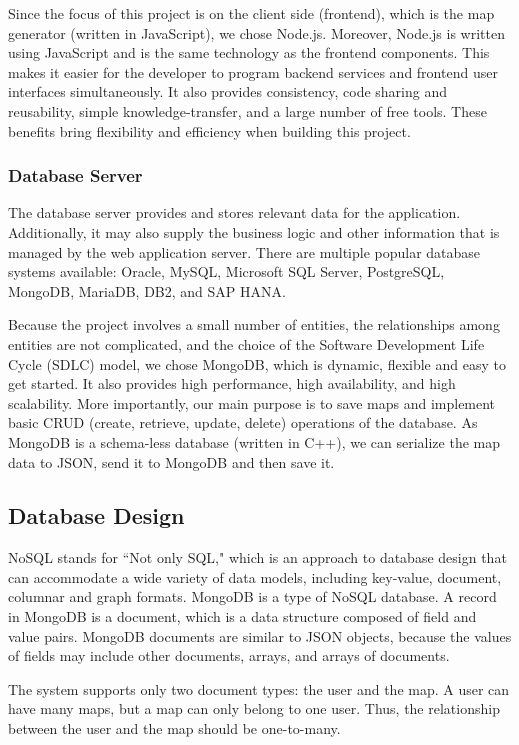 Since the focus of this project is on the client side (frontend), which is the map generator (written in JavaScript), we chose Node.js. Moreover, Node.js is written using JavaScript and is the same technology as the frontend components. This makes it easier for the developer to program backend services and frontend user interfaces simultaneously. It also provides consistency, code sharing and reusability, simple knowledge-transfer, and a large number of free tools. These benefits bring flexibility and efficiency when building this project.

\subsubsection{Database Server}
\label{sec:Design>Architecture Design>Database Server}
The database server provides and stores relevant data for the application. Additionally, it may also supply the business logic and other information that is managed by the web application server. There are multiple popular database systems available: Oracle, MySQL, Microsoft SQL Server, PostgreSQL, MongoDB, MariaDB, DB2, and SAP HANA.

Because the project involves a small number of entities, the relationships among entities are not complicated, and the choice of the Software Development Life Cycle (SDLC) model, we chose MongoDB, which is dynamic, flexible and easy to get started. It also provides high performance, high availability, and high scalability. More importantly, our main purpose is to save maps and implement basic CRUD (create, retrieve, update, delete) operations of the database. As MongoDB is a schema-less database (written in C++), we can serialize the map data to JSON, send it to MongoDB and then save it.

\subsection{Database Design}
\label{sec:Design>Database Design}
NoSQL stands for ``Not only SQL," which is an approach to database design that can accommodate a wide variety of data models, including key-value, document, columnar and graph formats. MongoDB is a type of NoSQL database. A record in MongoDB is a document, which is a data structure composed of field and value pairs. MongoDB documents are similar to JSON objects, because the values of fields may include other documents, arrays, and arrays of documents.

The system supports only two document types: the user and the map. A user can have many maps, but a map can only belong to one user. Thus, the relationship between the user and the map should be one-to-many.


